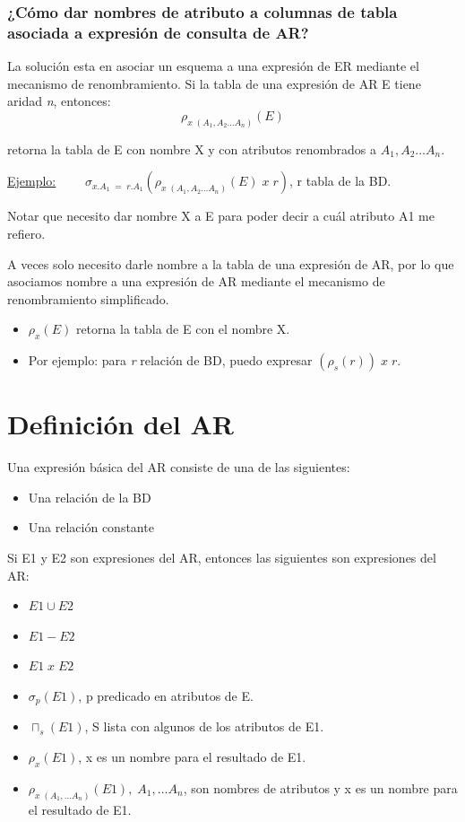 \documentclass[12pt,a4paper]{report}
\begin{document}
		\subsubsection{¿Cómo dar nombres de atributo a columnas de tabla asociada a expresión de consulta de AR?}
			\par La solución esta en asociar un esquema a una expresión de ER mediante el mecanismo de renombramiento. Si la tabla de una expresión de AR E tiene aridad \textit{n}, entonces:
			\[ \rho_{x \; (A_{1}, A_{2} \dotsc A_{n})}(E)\]

			\par retorna la tabla de E con nombre X y con atributos renombrados a $A_{1}, A_{2} \dotsc A_{n}$.

			\vspace{5mm}
			\underline{Ejemplo:}
			$\qquad \sigma_{x . A_{1} \; = \; r . A_{1}}(\rho_{x \; (A_{1}, A_{2} \dotsc A_{n})} (E) \; x \; r) $, r tabla de la BD.
			\par Notar que necesito dar nombre X a E para poder decir a cuál atributo A1 me refiero.
			
			\vspace{5mm}			
			\par A veces solo necesito darle nombre a la tabla de una expresión de AR, por lo que asociamos nombre a una expresión de AR mediante el mecanismo de renombramiento simplificado.
\begin{itemize}
	\item $\rho_{x}(E)$ retorna la tabla de E con el nombre X.
	\item Por ejemplo: para \textit{r} relación de BD, puedo expresar $(\rho_{s}(r)) \; x \; r$.
\end{itemize}


	\section{Definición del AR}
		\par Una expresión básica del AR consiste de una de las siguientes:
		\begin{itemize}
			\item Una relación de la BD
			\item Una relación constante
		\end{itemize}		 
		\par Si E1 y E2 son expresiones del AR, entonces las siguientes son expresiones del AR:
		\begin{itemize}
			\item $E1\cup E2$
			\item $E1 - E2$
			\item $E1\; x \; E2$
			\item $\sigma_{p}(E1)$, p predicado en atributos de E.
			\item $\sqcap_{s}(E1)$, S lista con algunos de los atributos de E1.
			\item $\rho_{x}(E1)$, x es un nombre para el resultado de E1.
			\item $\rho_{x \; (A_{1}, \dotsc A_{n})}(E1), \; A_{1}, \dotsc A_{n}$, son nombres de atributos y x es un nombre para el resultado de E1.
		\end{itemize}
\end{document}
